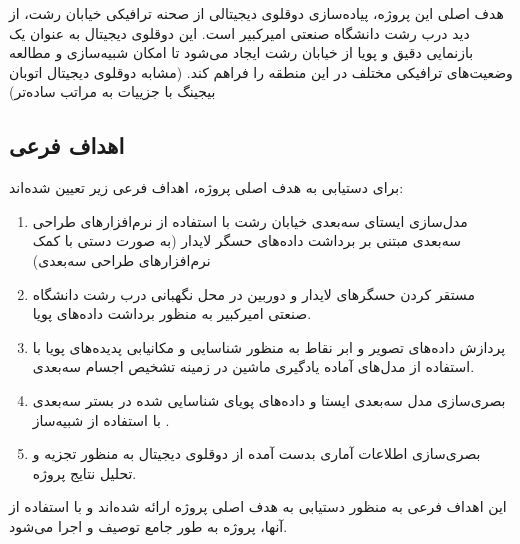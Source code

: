 هدف اصلی این پروژه، پیاده‌سازی دوقلوی دیجیتالی از صحنه ترافیکی خیابان رشت، از دید درب رشت دانشگاه صنعتی امیرکبیر است. این دوقلوی دیجیتال به عنوان یک بازنمایی دقیق و پویا از خیابان رشت ایجاد می‌شود تا امکان شبیه‌سازی و مطالعه وضعیت‌های ترافیکی مختلف در این منطقه را فراهم کند. (مشابه دوقلوی دیجیتال اتوبان بیجینگ با جزییات به مراتب ساده‌تر)

\subsection{اهداف فرعی}

برای دستیابی به هدف اصلی پروژه، اهداف فرعی زیر تعیین شده‌اند:

\begin{enumerate}
\item مدل‌سازی ایستای سه‌بعدی خیابان رشت با استفاده از نرم‌افزارهای طراحی سه‌بعدی مبتنی بر برداشت داد‌ه‌های حسگر لایدار (به صورت دستی با کمک نرم‌افزارهای طراحی سه‌بعدی)
\item مستقر کردن حسگر‌های لایدار و دوربین در محل نگهبانی درب رشت دانشگاه صنعتی امیرکبیر به منظور برداشت داده‌های پویا.
\item پردازش داده‌های تصویر و ابر نقاط به منظور شناسایی و مکانیابی پدیده‌های پویا با استفاده از مدل‌های آماده یادگیری ماشین در زمینه تشخیص اجسام سه‌بعدی.
\item بصری‌سازی مدل سه‌بعدی ایستا و داده‌های پویای شناسایی شده در بستر سه‌بعدی با استفاده از شبیه‌ساز .
\item بصری‌سازی اطلاعات آماری بدست آمده از دوقلوی دیجیتال به منظور تجزیه و تحلیل نتایج پروژه.
\end{enumerate}

این اهداف فرعی به منظور دستیابی به هدف اصلی پروژه ارائه شده‌اند و با استفاده از آنها، پروژه به طور جامع توصیف و اجرا می‌شود.